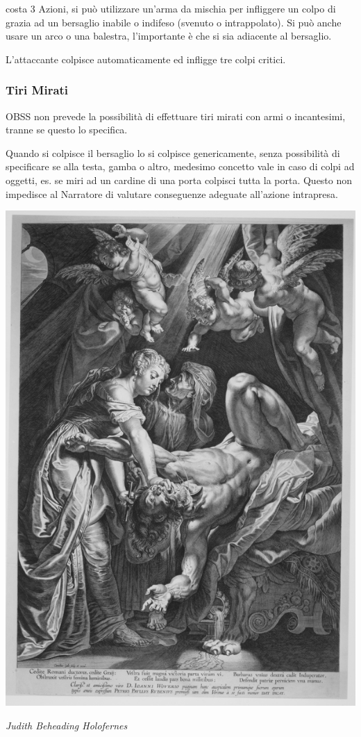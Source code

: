 \begin{multicols}{2}
costa 3 Azioni, si può utilizzare un'arma da mischia per infliggere un colpo di grazia ad un bersaglio inabile o indifeso (svenuto o intrappolato). Si può anche usare un arco o una balestra, l'importante è che si sia adiacente al bersaglio.

L'attaccante colpisce automaticamente ed infligge tre colpi critici.

\subsubsection{Tiri Mirati}\label{tirimirati}

OBSS non prevede la possibilità di effettuare tiri mirati con armi o incantesimi, tranne se questo lo specifica.

Quando si colpisce il bersaglio lo si colpisce genericamente, senza possibilità di specificare se alla testa, gamba o altro, medesimo concetto vale in caso di colpi ad oggetti, es. se miri ad un cardine di una porta colpisci tutta la porta. Questo non impedisce al Narratore di valutare conseguenze adeguate all'azione intrapresa.

\medskip

\begin{center}
	\includegraphics[width=0.6\linewidth]{immagini/Judith_Beheading_Holofernes_MET_MM27116.png}

	\emph{Judith Beheading Holofernes}
\end{center}


\end{multicols}
